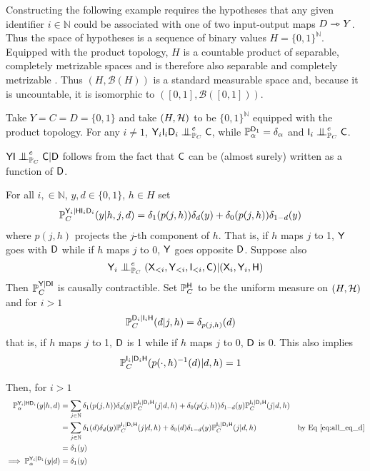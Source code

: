 Constructing the following example requires the hypotheses that any given identifier $i\in\mathbb{N}$ could be associated with one of two input-output maps $D\rightarrowtriangle Y$. Thus the space of hypotheses is a sequence of binary values $H=\{0,1\}^{\mathbb{N}}$. Equipped with the product topology, $H$ is a countable product of separable, completely metrizable spaces and is therefore also separable and completely metrizable \citep[Thm. 16.4,Thm. 24.11]{willard_general_1970}. Thus $(H,\mathcal{B}(H))$ is a standard measurable space and, because it is uncountable, it is isomorphic to $([0,1],\mathcal{B}([0,1]))$.

\begin{example}
Take $Y=C=D=\{0,1\}$ and take $(H,\mathcal{H})$ to be $\{0,1\}^{\mathbb{N}}$ equipped with the product topology. For any $i\neq 1$, $\RV{Y}_i\RV{I}_i\RV{D}_i\CI^e_{\prob{P}_C} \RV{C}$, while $\mathbb{P}_\alpha^{\mathsf{D}_1}=\delta_\alpha$ and $\RV{I}_i\CI^e_{\prob{P}_C} \RV{C}$.

$\RV{YI}\CI^e_{\prob{P}_C} \RV{C}|\RV{D}$ follows from the fact that $\mathsf{C}$ can be (almost surely) written as a function of $\mathsf{D}$.

For all $i,\in \mathbb{N}$, $y,d\in \{0,1\}$, $h\in H$ set
\begin{align}
    \mathbb{P}_C^{\mathsf{Y}_i|\mathsf{H}\mathsf{I}_i\mathsf{D}_i}(y|h,j,d) &= \delta_1(p(j,h))\delta_d(y) + \delta_0(p(j,h))\delta_{1-d}(y)
\end{align}
where $p(j,h)$ projects the $j$-th component of $h$. That is, if $h$ maps $j$ to 1, $\mathsf{Y}$ goes with $\mathsf{D}$ while if $h$ maps $j$ to $0$, $\mathsf{Y}$ goes opposite $\mathsf{D}$. Suppose also 
\begin{align}
    \RV{Y}_i\CI_{\prob{P}_C}^e (\RV{X}_{<i},\RV{Y}_{<i},\RV{I}_{<i},\RV{C})|(\RV{X}_i,\RV{Y}_i,\RV{H})
\end{align}
Then $\mathbb{P}_C^{\mathsf{Y}|\mathsf{DI}}$ is causally contractible. Set $\mathbb{P}_{C}^{\mathsf{H}}$ to be the uniform measure on $(H,\mathcal{H})$ and for $i>1$
\begin{align}
    \mathbb{P}_C^{\mathsf{D}_i|\mathsf{I}_i\mathsf{H}}(d|j,h) &= \delta_{p(j,h)}(d)
\end{align}
that is, if $h$ maps $j$ to 1, $\mathsf{D}$ is 1 while if $h$ maps $j$ to $0$, $\mathsf{D}$ is 0. This also implies
\begin{align}
    \mathbb{P}_C^{\mathsf{I}_i|\mathsf{D}_i\mathsf{H}}(p(\cdot,h)^{-1}(d)|d,h) &= 1\label{eq:all_eq_d}
\end{align}

Then, for $i>1$
\begin{align}
    \mathbb{P}_\alpha^{\mathsf{Y}_i|\mathsf{H}\mathsf{D}_i}(y|h,d) &= \sum_{j\in \mathbb{N}} \delta_1(p(j,h))\delta_d(y)\mathbb{P}_C^{\mathsf{I}_i|\mathsf{D}_i\mathsf{H}}(j|d,h) + \delta_0(p(j,h))\delta_{1-d}(y)\mathbb{P}_C^{\mathsf{I}_i|\mathsf{D}_i\mathsf{H}}(j|d,h)\\
    &= \sum_{j\in \mathbb{N}} \delta_1(d)\delta_d(y)\mathbb{P}_C^{\mathsf{I}_i|\mathsf{D}_i\mathsf{H}}(j|d,h) + \delta_0(d)\delta_{1-d}(y)\mathbb{P}_C^{\mathsf{I}_i|\mathsf{D}_i\mathsf{H}}(j|d,h)&\text{by Eq \ref{eq:all_eq_d}}\\
    &= \delta_1(y)\\
    \implies \mathbb{P}_\alpha^{\mathsf{Y}_i|\mathsf{D}_i}(y|d) &= \delta_1(y)
\end{align}


\end{example}
